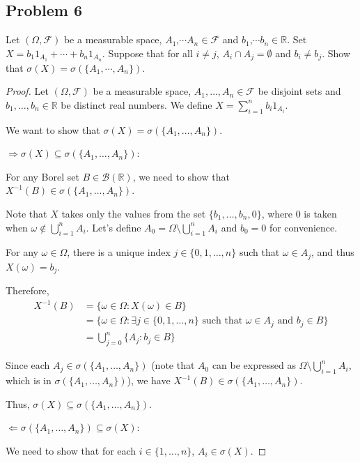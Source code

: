 \documentclass[letterpaper, 11pt]{article}
\newcommand{\1}{\mathds{1}}	%
\theoremstyle{definition}
\begin{document}
\subsection*{Problem 6}
Let $(\Omega, \mathcal{F})$ be a measurable space, $A_{1}$,$\cdots$$A_{n} \in \mathcal{F}$ and $b_{1}$,$\cdots$$b_{n} \in \mathbb{R}$. Set $X = b_{1}1_{A_{1}} + \cdots + b_{n}1_{A_{n}}$. Suppose that for all $i \neq j$, $A_{i} \cap A_{j} = \emptyset$ and $b_{i} \neq b_{j}$. Show that $\sigma(X) = \sigma(\{A_{1}, \cdots, A_{n}\})$.
\begin{proof}
    Let $(\Omega, \mathcal{F})$ be a measurable space, $A_1, \ldots, A_n \in \mathcal{F}$ be disjoint sets and $b_1, \ldots, b_n \in \mathbb{R}$ be distinct real numbers. We define $X = \sum_{i=1}^n b_i 1_{A_i}$.

We want to show that $\sigma(X) = \sigma(\{A_1, \ldots, A_n\})$.

$\Rightarrow \sigma(X) \subseteq \sigma(\{A_1, \ldots, A_n\})$:

For any Borel set $B \in \mathcal{B}(\mathbb{R})$, we need to show that $X^{-1}(B) \in \sigma(\{A_1, \ldots, A_n\})$.

Note that $X$ takes only the values from the set $\{b_1, \ldots, b_n, 0\}$, where $0$ is taken when $\omega \notin \bigcup_{i=1}^n A_i$. Let's define $A_0 = \Omega \setminus \bigcup_{i=1}^n A_i$ and $b_0 = 0$ for convenience.

For any $\omega \in \Omega$, there is a unique index $j \in \{0, 1, \ldots, n\}$ such that $\omega \in A_j$, and thus $X(\omega) = b_j$.

Therefore, 
\begin{align*}
X^{-1}(B) &= \{\omega \in \Omega : X(\omega) \in B\} \\
&= \{\omega \in \Omega : \exists j \in \{0, 1, \ldots, n\} \text{ such that } \omega \in A_j \text{ and } b_j \in B\} \\
&= \bigcup_{j=0}^n \{A_j : b_j \in B\}
\end{align*}

Since each $A_j \in \sigma(\{A_1, \ldots, A_n\})$ (note that $A_0$ can be expressed as $\Omega \setminus \bigcup_{i=1}^n A_i$, which is in $\sigma(\{A_1, \ldots, A_n\})$), we have $X^{-1}(B) \in \sigma(\{A_1, \ldots, A_n\})$.

Thus, $\sigma(X) \subseteq \sigma(\{A_1, \ldots, A_n\})$.

$\Leftarrow\sigma(\{A_1, \ldots, A_n\}) \subseteq \sigma(X)$:

We need to show that for each $i \in \{1, \ldots, n\}$, $A_i \in \sigma(X)$.


\end{proof}
\end{document}
